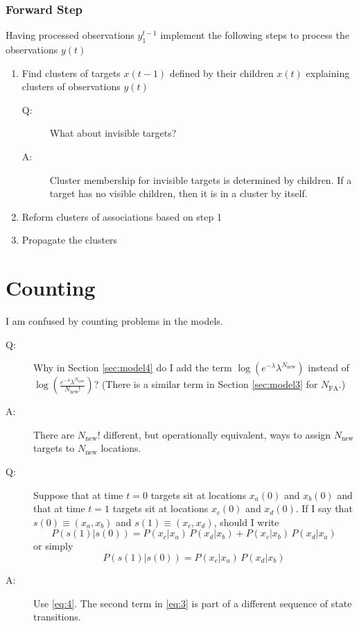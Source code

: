 \documentclass[12pt]{article}
\newcommand{\ti}[2]{{#1}{(#2)}}                         %
\newcommand{\ts}[4]{{#1}_{#3}^{#4}} %
\begin{document}
\subsubsection{Forward Step}
\label{sec:forward_b_m}

Having processed observations $\ts{y}{\tau}{1}{t-1}$ implement the
following steps to process the observations $\ti{y}{t}$
\begin{enumerate}
\item Find clusters of targets $\ti{x}{t-1}$ defined by their children
  $\ti{x}{t}$ explaining clusters of observations $\ti{y}{t}$
  \begin{description}
  \item[Q:] What about invisible targets?
  \item[A:] Cluster membership for invisible targets is determined by
    children.  If a target has no visible children, then it is in a
    cluster by itself.
  \end{description}
\item Reform clusters of associations based on step 1
\item Propagate the clusters
\end{enumerate}

\appendix
\section{Counting}
\label{sec:counting}

I am confused by counting problems in the models.
\begin{description}
\item[Q:] Why in Section \ref{sec:model4} do I add the term $\log
  \left( e^{-\lambda} \lambda^{N_{\text{new}}} \right)$ instead of
  $\log \left(
    \frac{e^{-\lambda}\lambda^{N_{\text{new}}}}{N_{\text{new}}!}\right)$?
  (There is a similar term in Section \ref{sec:model3} for
  $N_{\text{FA}}$.)
\item[A:] There are $N_{\text{new}}!$ different, but operationally
  equivalent, ways to assign $N_{\text{new}}$ targets to
  $N_{\text{new}}$ locations.
\item[Q:] Suppose that at time $t=0$ targets sit at locations
  $\ti{x_a}{0}$ and $\ti{x_b}{0}$ and that at time $t=1$ targets sit
  at locations $\ti{x_c}{0}$ and $\ti{x_d}{0}$.  If I say that
  $\ti{s}{0}\equiv \left(x_a,x_b \right)$ and $\ti{s}{1}\equiv
  \left(x_c,x_d \right)$, should I write
  \begin{equation}
    \label{eq:3}
    P(\ti{s}{1}|\ti{s}{0}) =  P(x_c|x_a) \,  P(x_d|x_b) +  P(x_c|x_b)
    \,  P(x_d|x_a)
  \end{equation}
  or simply
  \begin{equation}
    \label{eq:4}
    P(\ti{s}{1}|\ti{s}{0}) =  P(x_c|x_a) \,  P(x_d|x_b)
  \end{equation}
\item[A:] Use \eqref{eq:4}.  The second term in \eqref{eq:3} is part
  of a different sequence of state transitions.
\end{description}
\end{document}
